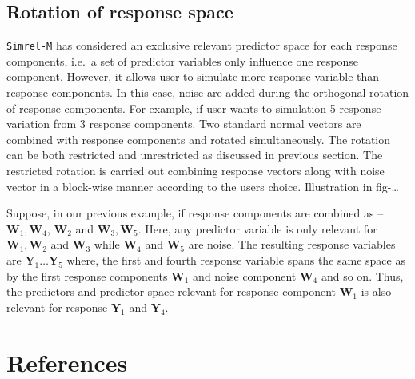 \documentclass[12pt,A4paper,authoryear]{elsarticle} %
\begin{document}
\subsection{Rotation of response space}\label{rotation-response-space}

\texttt{Simrel-M} has considered an exclusive relevant predictor space
for each response components, i.e.~a set of predictor variables only
influence one response component. However, it allows user to simulate
more response variable than response components. In this case, noise are
added during the orthogonal rotation of response components. For
example, if user wants to simulation 5 response variation from 3
response components. Two standard normal vectors are combined with
response components and rotated simultaneously. The rotation can be both
restricted and unrestricted as discussed in previous section. The
restricted rotation is carried out combining response vectors along with
noise vector in a block-wise manner according to the users choice.
Illustration in fig-\ldots{}

Suppose, in our previous example, if response components are combined as
-- \(\mathbf{W}_1, \mathbf{W}_4\), \(\mathbf{W}_2\) and
\(\mathbf{W}_3, \mathbf{W}_5\). Here, any predictor variable is only
relevant for \(\mathbf{W}_1, \mathbf{W}_2\) and \(\mathbf{W}_3\) while
\(\mathbf{W}_4\) and \(\mathbf{W}_5\) are noise. The resulting response
variables are \(\mathbf{Y}_1 \ldots \mathbf{Y}_5\) where, the first and
fourth response variable spans the same space as by the first response
components \(\mathbf{W}_1\) and noise component \(\mathbf{W}_4\) and so
on. Thus, the predictors and predictor space relevant for response
component \(\mathbf{W}_1\) is also relevant for response
\(\mathbf{Y}_1\) and \(\mathbf{Y}_4\).

\section*{References}\label{references}


\renewcommand\refname{References}

\end{document}
